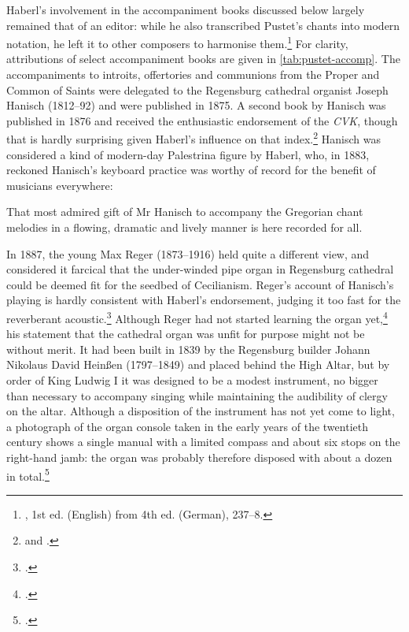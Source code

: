 Haberl's involvement in the accompaniment books discussed below largely remained that of an editor: while he also transcribed Pustet's chants into modern notation, he left it to other composers to harmonise them.\footnote{\cite{HaberlMagisterChoralisTheoretical1877}, 1st ed. (English) from 4th ed. (German), 237--8.}
For clarity, attributions of select accompaniment books are given in \cref{tab:pustet-accomp}.
The accompaniments to introits, offertories and communions from the Proper and Common of Saints were delegated to the Regensburg cathedral organist Joseph Hanisch (1812--92) and were published in 1875.
A second book by Hanisch was published in 1876 and received the enthusiastic endorsement of the \emph{CVK}, though that is hardly surprising given Haberl's influence on that index.\footnote{ and .}
Hanisch was considered a kind of modern-day Palestrina figure by Haberl, who, in 1883, reckoned Hanisch's keyboard practice was worthy of record for the benefit of musicians everywhere:
\noclub[2]

  {\cite[unpaginated `Aus dem Vorworte zur ersten Auflage']{HanischOrganumcomitansad1883}}
{That most admired gift of Mr Hanisch to accompany the Gregorian chant melodies in a flowing, dramatic and lively manner is here recorded for all.}

In 1887, the young Max Reger (1873--1916) held quite a different view, and considered it farcical that the under-winded pipe organ in Regensburg cathedral could be deemed fit for the seedbed of Cecilianism.
Reger's account of Hanisch's playing is hardly consistent with Haberl's endorsement, judging it too fast for the reverberant acoustic.\footcite[79]{AndersonMaxReger18732012}
Although Reger had not started learning the organ yet,\footcite[p.~217; Reger took piano lessons from 1884 and organ lessons from 1888]{AdamsModernOrganStyle2007} his statement that the cathedral organ was unfit for purpose might not be without merit.
It had been built in 1839 by the Regensburg builder Johann Nikolaus David Heinßen (1797--1849) and placed behind the High Altar, but by order of King Ludwig I it was designed to be a modest instrument, no bigger than necessary to accompany singing while maintaining the audibility of clergy on the altar.
%
Although a disposition of the instrument has not yet come to light, a photograph of the organ console taken in the early years of the twentieth century shows a single manual with a limited compass and about six stops on the right-hand jamb: the organ was probably therefore disposed with about a dozen in total.\footnote{\cite[35--7]{DittrichZurGeschichteOrgeln2010}.\label{fn:renner_photo}}

